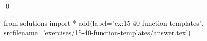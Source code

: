 
\begin{ex}
  \label{ex:15-40-function-templates}
  
  \qed
\end{ex}
\begin{python0}
from solutions import *
add(label="ex:15-40-function-templates",
    srcfilename='exercises/15-40-function-templates/answer.tex')
\end{python0}
